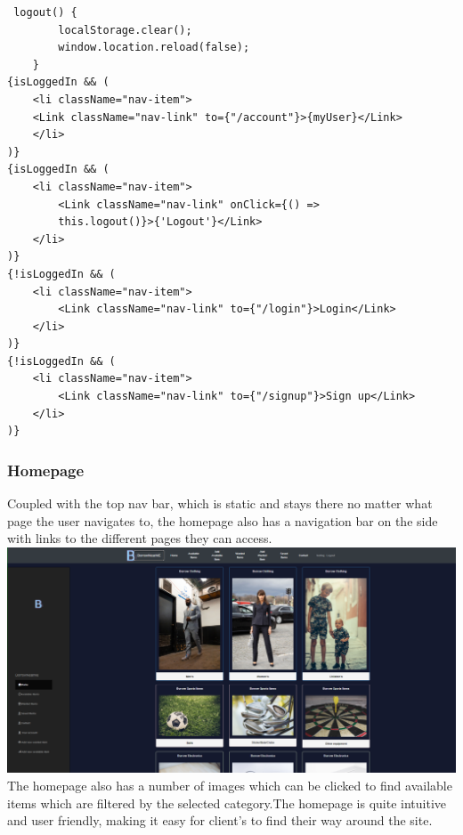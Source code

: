 \begin{verbatim}
 logout() {
        localStorage.clear();
        window.location.reload(false);
    }
{isLoggedIn && (
    <li className="nav-item">
    <Link className="nav-link" to={"/account"}>{myUser}</Link>
    </li>
)}
{isLoggedIn && (
    <li className="nav-item">
        <Link className="nav-link" onClick={() => 
        this.logout()}>{'Logout'}</Link>
    </li>
)}
{!isLoggedIn && (
    <li className="nav-item">
        <Link className="nav-link" to={"/login"}>Login</Link>
    </li>
)}
{!isLoggedIn && (
    <li className="nav-item">
        <Link className="nav-link" to={"/signup"}>Sign up</Link>
    </li>
)}
\end{verbatim}
\subsubsection{Homepage}
Coupled with the top nav bar, which is static and stays there no matter what page the user navigates to, the homepage also has a navigation bar on the side with links to the different pages they can access.
\newline
\includegraphics[scale=0.3]{img/fe_homepage.PNG}
\newline
The homepage also has a number of images which can be clicked to find available items which are filtered by the selected category.The homepage is quite intuitive and user friendly, making it easy for client's to find their way around the site.  
